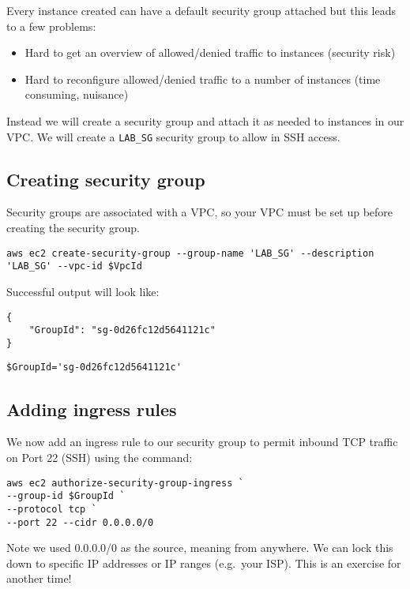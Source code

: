 \documentclass{pgnotes}
\begin{document}
Every instance created can have a default security group attached but
this leads to a few problems:

\begin{itemize}
\item
  Hard to get an overview of allowed/denied traffic to instances
  (security risk)
\item
  Hard to reconfigure allowed/denied traffic to a number of instances
  (time consuming, nuisance)
\end{itemize}

Instead we will create a security group and attach it as needed to
instances in our VPC. We will create a \texttt{LAB\_SG} security group
to allow in SSH access.

\subsection{Creating security group}\label{sec:creating-security-group}

Security groups are associated with a VPC, so your VPC must be set up
before creating the security group.

\begin{verbatim}
aws ec2 create-security-group --group-name 'LAB_SG' --description 'LAB_SG' --vpc-id $VpcId
\end{verbatim}

Successful output will look like:

\begin{verbatim}
{
    "GroupId": "sg-0d26fc12d5641121c"
}
\end{verbatim}

\begin{verbatim}
$GroupId='sg-0d26fc12d5641121c'
\end{verbatim}

\subsection{Adding ingress rules}\label{adding-ingress-rules}

We now add an ingress rule to our security group to permit inbound TCP
traffic on Port 22 (SSH) using the command:

\begin{verbatim}
aws ec2 authorize-security-group-ingress `
--group-id $GroupId `
--protocol tcp `
--port 22 --cidr 0.0.0.0/0
\end{verbatim}

Note we used 0.0.0.0/0 as the source, meaning from anywhere. We can lock
this down to specific IP addresses or IP ranges (e.g.~your ISP). This is
an exercise for another time!
\end{document}
